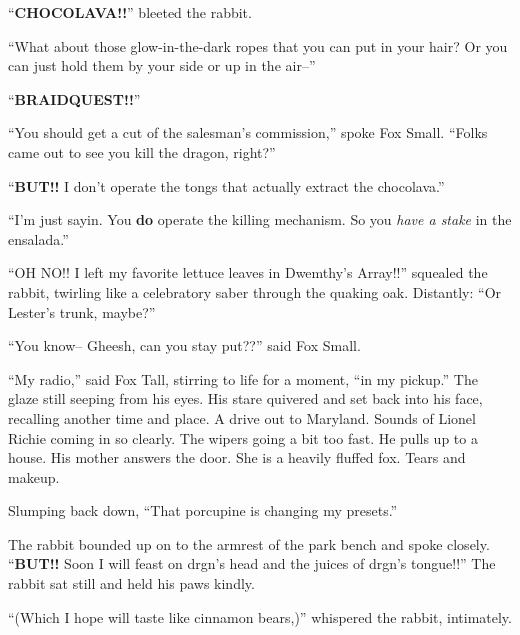 \documentclass[12pt,twoside]{report}
\begin{document}
``{\bf CHOCOLAVA!!}'' bleeted the rabbit.

``What about those glow-in-the-dark ropes that you can put in your
        hair?  Or you can just hold them by your side or up in the
        air--''

``{\bf BRAIDQUEST!!}''

``You should get a cut of the salesman's commission,'' spoke Fox
        Small.  ``Folks came out to see you kill the dragon, right?''

``{\bf BUT!!}  I don't operate the tongs that actually extract the
        chocolava.''

``I'm just sayin.  You {\bf do} operate the killing mechanism.  So you
        {\em have a stake} in the ensalada.''

``OH NO!!  I left my favorite lettuce leaves in Dwemthy's Array!!''
        squealed the rabbit, twirling like a celebratory saber through
        the quaking oak.  Distantly: ``Or Lester's trunk, maybe?''

``You know-- Gheesh, can you stay put??'' said Fox Small.

``My radio,'' said Fox Tall, stirring to life for a moment, ``in my
        pickup.''  The glaze still seeping from his eyes.  His stare
        quivered and set back into his face, recalling another time
        and place.  A drive out to Maryland.  Sounds of Lionel Richie
        coming in so clearly.  The wipers going a bit too fast.  He
        pulls up to a house.  His mother answers the door. She is a
        heavily fluffed fox.  Tears and makeup.

Slumping back down, ``That porcupine is changing my presets.''

The rabbit bounded up on to the armrest of the park bench and spoke
closely.  ``{\bf BUT!!} Soon I will feast on drgn's head and the
juices of drgn's tongue!!''  The rabbit sat still and held his paws
kindly.

``(Which I hope will taste like cinnamon bears,)'' whispered the
rabbit, intimately.
\end{document}
